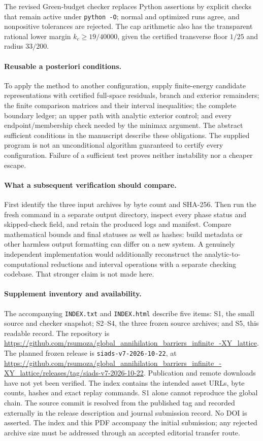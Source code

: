 \documentclass[10pt]{article}
\newcommand{\code}[1]{\nolinkurl{#1}}
\begin{document}
The revised Green-budget checker replaces Python assertions by explicit
checks that remain active under \mbox{\texttt{python -O}}; normal and optimized
runs agree, and nonpositive tolerances are rejected. The cap arithmetic
also has the transparent rational lower margin $k_c\ge19/40000$, given
the certified transverse floor $1/25$ and radius $33/200$.

\paragraph{Reusable a posteriori conditions.}
To apply the method to another configuration, supply finite-energy candidate
representations with certified full-space residuals, branch and exterior
remainders; the finite comparison matrices and their interval inequalities;
the complete boundary ledger; an upper path with analytic exterior control;
and every endpoint/membership check needed by the minimax argument. The
abstract sufficient conditions in the manuscript describe these obligations.
The supplied program is not an unconditional algorithm guaranteed to
certify every configuration. Failure of a sufficient test proves neither
instability nor a cheaper escape.

\paragraph{What a subsequent verification should compare.}
First identify the three input archives by byte count and SHA-256. Then
run the fresh command in a separate output directory, inspect every phase
status and skipped-check field, and retain the produced logs and manifest.
Compare mathematical bounds and final statuses as well as hashes: build
metadata or other harmless output formatting can differ on a new system.
A genuinely independent implementation would additionally reconstruct the
analytic-to-computational reductions and interval operations with a separate
checking codebase. That stronger claim is not made here.

\paragraph{Supplement inventory and availability.}
The accompanying \code{INDEX.txt} and \code{INDEX.html} describe five items:
S1, the small source and checker snapshot; S2--S4, the three frozen source
archives; and S5, this readable record. The repository is
\url{https://github.com/rsumoza/global_annihilation_barriers_infinite_-XY_lattice}.
The planned frozen release is \texttt{siads-v7-2026-10-22}, at
\url{https://github.com/rsumoza/global_annihilation_barriers_infinite_-XY_lattice/releases/tag/siads-v7-2026-10-22}.
Publication and remote downloads have not yet been verified. The index
contains the intended asset URLs, byte counts, hashes and exact replay
commands. S1 alone cannot reproduce the global chain. The source commit
is resolved from the published tag and recorded externally in the release
description and journal submission record. No DOI is asserted. The index
and this PDF accompany the initial submission; any rejected archive size
must be addressed through an accepted editorial transfer route.
\end{document}

